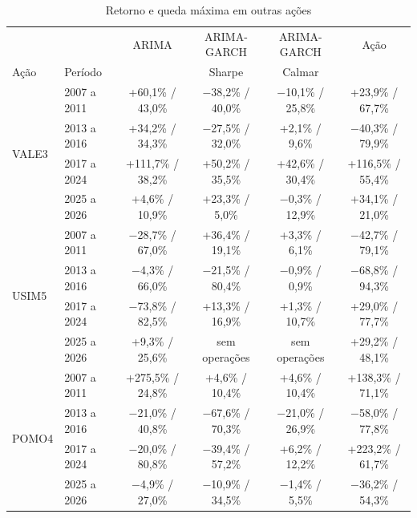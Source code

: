 \begin{table}[htbp]
\centering
\caption{Retorno e queda máxima em outras ações}
\label{tab:outras}
\fontsize{10}{12}\selectfont
\begin{tabular}{l|l|c|c|c|c}
\hline
& & ARIMA & ARIMA-GARCH & ARIMA-GARCH & Ação \\
Ação & Período & & Sharpe & Calmar & \\
\hline
\multirow{4}{*}{VALE3} & 2007 a 2011 & +60,1\% / 43,0\% & $-$38,2\% / 40,0\% & $-$10,1\% / 25,8\% & +23,9\% / 67,7\% \\
 & 2013 a 2016 & +34,2\% / 34,3\% & $-$27,5\% / 32,0\% & +2,1\% / 9,6\% & $-$40,3\% / 79,9\% \\
 & 2017 a 2024 & +111,7\% / 38,2\% & +50,2\% / 35,5\% & +42,6\% / 30,4\% & +116,5\% / 55,4\% \\
 & 2025 a 2026 & +4,6\% / 10,9\% & +23,3\% / 5,0\% & $-$0,3\% / 12,9\% & +34,1\% / 21,0\% \\
\hline
\multirow{4}{*}{USIM5} & 2007 a 2011 & $-$28,7\% / 67,0\% & +36,4\% / 19,1\% & +3,3\% / 6,1\% & $-$42,7\% / 79,1\% \\
 & 2013 a 2016 & $-$4,3\% / 66,0\% & $-$21,5\% / 80,4\% & $-$0,9\% / 0,9\% & $-$68,8\% / 94,3\% \\
 & 2017 a 2024 & $-$73,8\% / 82,5\% & +13,3\% / 16,9\% & +1,3\% / 10,7\% & +29,0\% / 77,7\% \\
 & 2025 a 2026 & +9,3\% / 25,6\% & sem operações & sem operações & +29,2\% / 48,1\% \\
\hline
\multirow{4}{*}{POMO4} & 2007 a 2011 & +275,5\% / 24,8\% & +4,6\% / 10,4\% & +4,6\% / 10,4\% & +138,3\% / 71,1\% \\
 & 2013 a 2016 & $-$21,0\% / 40,8\% & $-$67,6\% / 70,3\% & $-$21,0\% / 26,9\% & $-$58,0\% / 77,8\% \\
 & 2017 a 2024 & $-$20,0\% / 80,8\% & $-$39,4\% / 57,2\% & +6,2\% / 12,2\% & +223,2\% / 61,7\% \\
 & 2025 a 2026 & $-$4,9\% / 27,0\% & $-$10,9\% / 34,5\% & $-$1,4\% / 5,5\% & $-$36,2\% / 54,3\% \\
\hline
\end{tabular}
\end{table}
